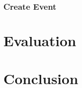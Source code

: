 \documentclass[a4paper,oneside,12pt]{report}
\begin{document}
	\subsection{Create Event}

	\chapter{Evaluation}

	\chapter{Conclusion}

	\printbibliography

	\printglossaries
\end{document}
